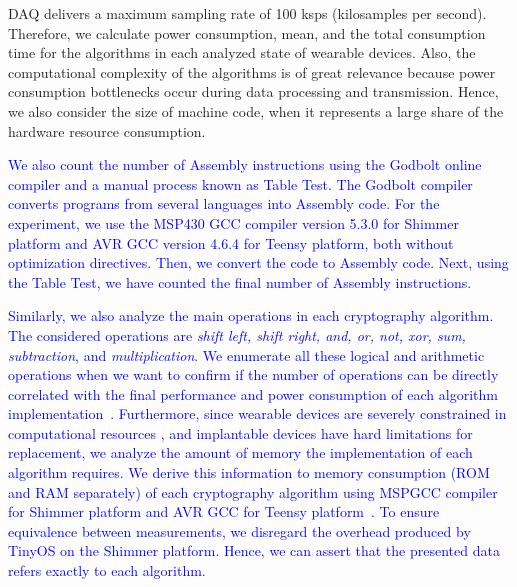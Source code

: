 \documentclass[journal]{IEEEtran}
\newcommand{\rever}{\textcolor{blue}}
\begin{document}
DAQ delivers a maximum sampling rate of 100 ksps (kilosamples per second). Therefore, we calculate power consumption, mean, and the total consumption time for the algorithms in each analyzed state of wearable devices. Also, the computational complexity of the algorithms is of great relevance because power consumption bottlenecks occur during data processing and transmission. Hence, we also consider the size of machine code, when it represents a large share of the hardware resource consumption.


\rever{%
We also count the number of Assembly instructions using the Godbolt online compiler and a manual process known as Table Test. The Godbolt compiler converts programs from several languages into Assembly code. For the experiment, we use the MSP430 GCC compiler version 5.3.0 %
for Shimmer platform and AVR GCC version 4.6.4 for Teensy platform, both without optimization directives. Then, we convert the %
code to Assembly code. Next, using the Table Test, we have counted the final number of Assembly instructions.}

\rever{Similarly, we also analyze the main operations in each cryptography algorithm. The considered operations are {\em shift left, shift right, and, or, not, xor, sum, subtraction}, and {\em multiplication}. We enumerate all these logical and arithmetic operations when we want to confirm if the number of operations can be directly correlated with the final performance and power consumption of each algorithm implementation~\cite{mohd2018lightweight}. Furthermore, since wearable devices are severely constrained in computational resources \rever{, and implantable devices have hard limitations for replacement}, we analyze the amount of memory the implementation of each algorithm requires. We derive this information to memory consumption (ROM and RAM separately) of each cryptography algorithm using MSPGCC compiler for Shimmer platform and AVR GCC for Teensy platform~\cite{cazorla2013survey}. %
To ensure equivalence between measurements, we disregard the overhead produced by TinyOS on the Shimmer platform. Hence, we can assert that the presented data refers exactly to each algorithm.}
\end{document}
